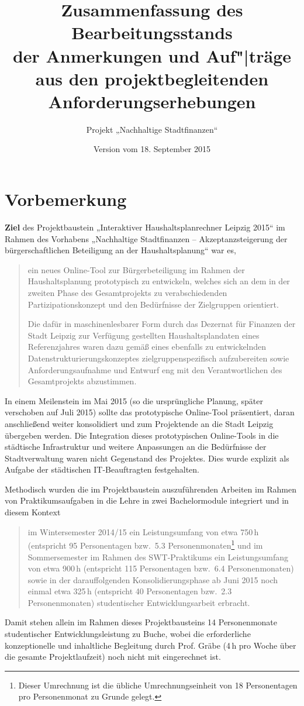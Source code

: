 \documentclass[11pt,a4paper,twoside]{article}
\title{Zusammenfassung des Bearbeitungsstands\\[3pt] der Anmerkungen und
  Auf"|träge\\[3pt] aus den projektbegleitenden Anforderungserhebungen}
\author{Projekt „Nachhaltige Stadtfinanzen“}
\date{Version vom 18. September 2015}
\begin{document}
\maketitle
\tableofcontents
\thispagestyle{empty}
\seitezwei
\newpage

\section{Vorbemerkung}

\textbf{Ziel} des Projektbaustein „Interaktiver Haushaltsplanrechner Leipzig
2015“ im Rahmen des Vorhabens „Nachhaltige Stadtfinanzen – Akzeptanzsteigerung
der bürgerschaftlichen Beteiligung an der Haushaltsplanung“ war es,
\begin{quote}
  ein neues Online-Tool zur Bürgerbeteiligung im Rahmen der Haushaltsplanung
  prototypisch zu entwickeln, welches sich an dem in der zweiten Phase des
  Gesamtprojekts zu verabschiedenden Partizipationskonzept und den Bedürfnisse
  der Zielgruppen orientiert.

Die dafür in maschinenlesbarer Form durch das Dezernat für Finanzen der Stadt
Leipzig zur Verfügung gestellten Haushaltsplandaten eines Referenzjahres waren
dazu gemäß eines ebenfalls zu entwickelnden Datenstrukturierungskonzeptes
zielgruppenspezifisch aufzubereiten sowie Anforderungsaufnahme und Entwurf eng
mit den Verantwortlichen des Gesamtprojekts abzustimmen.
\end{quote}
In einem Meilenstein im Mai 2015 (so die ursprüngliche Planung, später
verschoben auf Juli 2015) sollte das prototypische Online-Tool präsentiert,
daran anschließend weiter konsolidiert und zum Projektende an die Stadt Leipzig
übergeben werden. Die Integration dieses prototypischen Online-Tools in die
städtische Infrastruktur und weitere Anpassungen an die Bedürfnisse der
Stadtverwaltung waren nicht Gegenstand des Projektes. Dies wurde explizit als
Aufgabe der städtischen IT-Beauftragten festgehalten.

Methodisch wurden die im Projektbaustein auszuführenden Arbeiten im Rahmen von
Praktikumsaufgaben in die Lehre in zwei Bachelormodule integriert und in
diesem Kontext
\begin{quote}
  im Wintersemester 2014/15 ein Leistungsumfang von etwa 750\,h (entspricht 95
  Personentagen bzw.\ 5.3 Personenmonaten\footnote{Dieser Umrechnung ist die
    übliche Umrechnungseinheit von 18 Personentagen pro Personenmonat zu Grunde
    gelegt.} und im Sommersemester im Rahmen des SWT-Praktikums ein
  Leistungsumfang von etwa 900\,h (entspricht 115 Personentagen bzw.\ 6.4
  Personenmonaten) sowie in der darauffolgenden Konsolidierungsphase ab Juni
  2015 noch einmal etwa 325\,h (entspricht 40 Personentagen bzw.\ 2.3
  Personenmonaten) studentischer Entwicklungsarbeit erbracht.
\end{quote}
Damit stehen allein im Rahmen dieses Projektbausteins 14 Personenmonate
studentischer Entwicklungsleistung zu Buche, wobei die erforderliche
konzeptionelle und inhaltliche Begleitung durch Prof. Gräbe (4\,h pro Woche
über die gesamte Projektlaufzeit) noch nicht mit eingerechnet ist.
\end{document}
